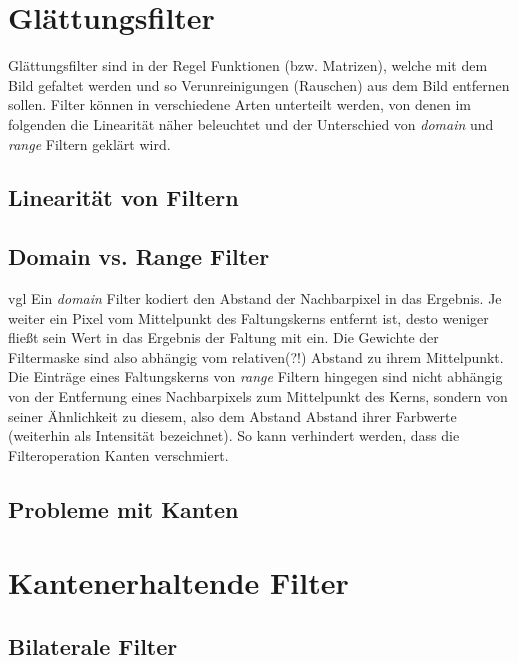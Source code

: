 \documentclass[conference]{IEEEtran}
\begin{document}

\section{Glättungsfilter}

Glättungsfilter sind in der Regel Funktionen (bzw. Matrizen), welche mit dem Bild gefaltet werden und so Verunreinigungen (Rauschen) aus dem Bild entfernen sollen.
Filter können in verschiedene Arten unterteilt werden, von denen im folgenden die Linearität näher beleuchtet und der Unterschied von \textit{domain} und \textit{range} Filtern geklärt wird.

\subsection{Linearität von Filtern}



\subsection{Domain vs. Range Filter}

vgl \cite{burger2009principles}
Ein \textit{domain} Filter kodiert den Abstand der Nachbarpixel in das Ergebnis. Je weiter ein Pixel vom Mittelpunkt des Faltungskerns entfernt ist, desto weniger fließt sein Wert in das Ergebnis der Faltung mit ein. Die Gewichte der Filtermaske sind also abhängig vom relativen(?!) Abstand zu ihrem Mittelpunkt.
Die Einträge eines Faltungskerns von \textit{range} Filtern hingegen sind nicht abhängig von der Entfernung eines Nachbarpixels zum Mittelpunkt des Kerns, sondern von seiner Ähnlichkeit zu diesem, also dem Abstand Abstand ihrer Farbwerte (weiterhin als Intensität bezeichnet). So kann verhindert werden, dass die Filteroperation Kanten verschmiert.

\subsection{Probleme mit Kanten}

\section{Kantenerhaltende Filter}

\subsection{Bilaterale Filter}
\end{document}
